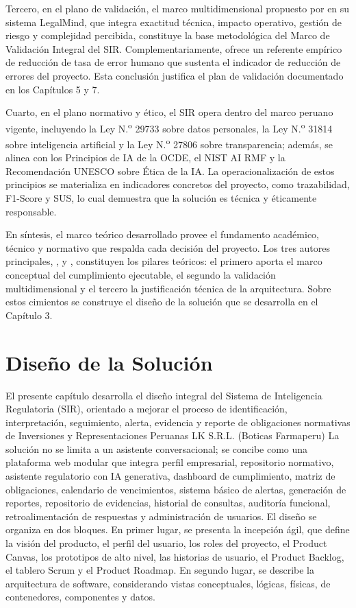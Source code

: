 \documentclass[12pt,a4paper,oneside]{report}
\begin{document}
Tercero, en el plano de validación, el marco multidimensional propuesto por \textcite{raju2025} en su sistema LegalMind, que integra exactitud técnica, impacto operativo, gestión de riesgo y complejidad percibida, constituye la base metodológica del Marco de Validación Integral del SIR. Complementariamente, \textcite{orosz2021} ofrece un referente empírico de reducción de tasa de error humano que sustenta el indicador de reducción de errores del proyecto. Esta conclusión justifica el plan de validación documentado en los Capítulos 5 y 7.

Cuarto, en el plano normativo y ético, el SIR opera dentro del marco peruano vigente, incluyendo la Ley N.\textsuperscript{o} 29733 sobre datos personales, la Ley N.\textsuperscript{o} 31814 sobre inteligencia artificial y la Ley N.\textsuperscript{o} 27806 sobre transparencia; además, se alinea con los Principios de IA de la OCDE, el NIST AI RMF y la Recomendación UNESCO sobre Ética de la IA. La operacionalización de estos principios se materializa en indicadores concretos del proyecto, como trazabilidad, F1-Score y SUS, lo cual demuestra que la solución es técnica y éticamente responsable.

En síntesis, el marco teórico desarrollado provee el fundamento académico, técnico y normativo que respalda cada decisión del proyecto. Los tres autores principales, \textcite{singh2022}, \textcite{raju2025} y \textcite{noronha2025}, constituyen los pilares teóricos: el primero aporta el marco conceptual del cumplimiento ejecutable, el segundo la validación multidimensional y el tercero la justificación técnica de la arquitectura. Sobre estos cimientos se construye el diseño de la solución que se desarrolla en el Capítulo 3.


\chapter{Diseño de la Solución}\label{cap:3-diseno-de-la-solucion}

El presente capítulo desarrolla el diseño integral del Sistema de Inteligencia Regulatoria (SIR), orientado a mejorar el proceso de identificación, interpretación, seguimiento, alerta, evidencia y reporte de obligaciones normativas de Inversiones y Representaciones Peruanas LK S.R.L. (Boticas Farmaperu) La solución no se limita a un asistente conversacional; se concibe como una plataforma web modular que integra perfil empresarial, repositorio normativo, asistente regulatorio con IA generativa, dashboard de cumplimiento, matriz de obligaciones, calendario de vencimientos, sistema básico de alertas, generación de reportes, repositorio de evidencias, historial de consultas, auditoría funcional, retroalimentación de respuestas y administración de usuarios. El diseño se organiza en dos bloques. En primer lugar, se presenta la incepción ágil, que define la visión del producto, el perfil del usuario, los roles del proyecto, el Product Canvas, los prototipos de alto nivel, las historias de usuario, el Product Backlog, el tablero Scrum y el Product Roadmap. En segundo lugar, se describe la arquitectura de software, considerando vistas conceptuales, lógicas, físicas, de contenedores, componentes y datos.
\end{document}
